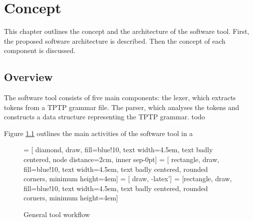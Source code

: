 
\chapter{Concept}\label{cha:Concept}
This chapter outlines the concept and the architecture of the software tool. First, the proposed software architecture is described. Then the concept of each component is discussed.
 \section{Overview}\label{sec:ConceptOverview}
The software tool consists of five main components: the lexer, which extracts tokens from a \ac{TPTP} grammar file. The parser, which analyses the tokens and constructs a data structure representing the \ac{TPTP} grammar. todo

Figure \ref{fig:ConceptConceptWorkflow} outlines the main activities of the software tool in a 
\begin{figure}[H]
 = [ diamond, draw, fill=blue!10, text width=4.5em, text badly centered, node distance=2cm, inner sep-0pt]  
 = [ rectangle, draw, fill=blue!10, text width=4.5em, text badly centered, rounded corners, minimum height=4em]  
 = [ draw, -latex']  
 = [rectangle, draw, fill=blue!10, text width=4.5em, text badly centered, rounded corners, minimum height=4em]  
\begin{center}
\end{center}
\caption{General tool workflow}
\label{fig:ConceptConceptWorkflow}
\end{figure}

